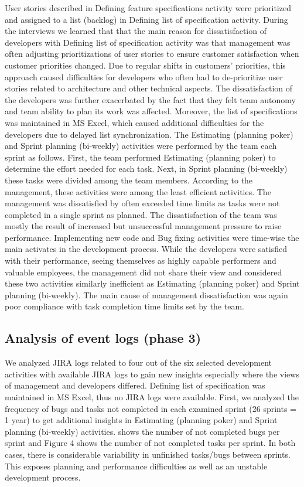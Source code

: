 User stories described in Defining feature specifications activity were prioritized and assigned to a list (backlog) in Defining list of specification activity. During the interviews we learned that that the main reason for dissatisfaction of developers with Defining list of specification activity was that management was often adjusting prioritizations of user stories to ensure customer satisfaction when customer priorities changed. Due to regular shifts in customers’ priorities, this approach caused difficulties for developers who often had to de-prioritize user stories related to architecture and other technical aspects. The dissatisfaction of the developers was further exacerbated by the fact that they felt team autonomy and team ability to plan its work was affected. Moreover, the list of specifications was maintained in MS Excel, which caused additional difficulties for the developers due to delayed list synchronization. 
The Estimating (planning poker) and Sprint planning (bi-weekly) activities were performed by the team each sprint as follows. First, the team performed Estimating (planning poker) to determine the effort needed for each task. Next, in Sprint planning (bi-weekly) these tasks were divided among the team members. According to the management, these activities were among the least efficient activities. The management was dissatisfied by often exceeded time limits as tasks were not completed in a single sprint as planned. The dissatisfaction of the team was mostly the result of increased but unsuccessful management pressure to raise performance.
Implementing new code and Bug fixing activities were time-wise the main activates in the development process. While the developers were satisfied with their performance, seeing themselves as highly capable performers and valuable employees, the management did not share their view and considered these two activities similarly inefficient as Estimating (planning poker) and Sprint planning (bi-weekly). The main cause of management dissatisfaction was again poor compliance with task completion time limits set by the team.

\subsection{Analysis of event logs (phase 3)}
We analyzed JIRA logs related to four out of the six selected development activities with available JIRA logs to gain new insights especially where the views of management and developers differed. Defining list of specification was maintained in MS Excel, thus no JIRA logs were available. First, we analyzed the frequency of bugs and tasks not completed in each examined sprint (26 sprints = 1 year) to get additional insights in Estimating (planning poker) and Sprint planning (bi-weekly) activities.  shows the number of not completed bugs per sprint and Figure 4 shows the number of not completed tasks per sprint. In both cases, there is considerable variability in unfinished tasks/bugs between sprints. This exposes planning and performance difficulties as well as an unstable development process. 


